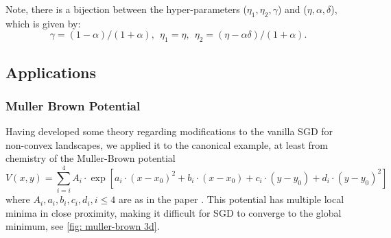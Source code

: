 \documentclass{article}
\begin{document}
Note, there is a bijection between the hyper-parameters ($\eta_1,\eta_2,\gamma$) and ($\eta,\alpha,\delta$), which is given by:
\begin{equation}\label{eq:parabijection}
    \gamma =(1-\alpha)/(1+\alpha), \ \ \eta_1 = \eta,   \ \  \eta_2 = (\eta-\alpha\delta)/(1+\alpha).
\end{equation}


\subsection{Applications}

\subsubsection{Muller Brown Potential}

Having developed some theory regarding modifications to the vanilla SGD for non-convex landscapes, we applied it to the canonical example, at least from chemistry \cite{muller1979location} of the Muller-Brown potential 
\begin{equation}
	V(x,y) = \displaystyle\sum^{4}_{i=i}A_{i}\cdot \exp[a_{i}\cdot(x-x_{0})^{2}+b_{i}\cdot(x-x_{0})+c_{i}\cdot(y-y_{0})+d_{i}\cdot (y-y_{0})^{2}] 
\end{equation}
where $A_{i}, a_{i}, b_{i}, c_{i}, d_{i}, i\leq 4$ are as in the paper \cite{muller1979location}. This potential has multiple local minima in close proximity, making it difficult for SGD to converge to the global minimum, see \ref{fig: muller-brown 3d}.
\end{document}
